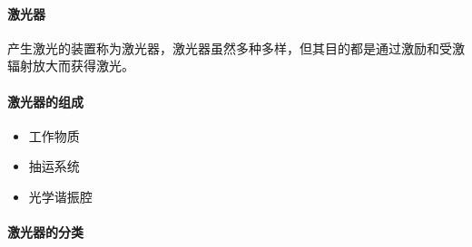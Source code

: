 \paragraph{激光器}产生激光的装置称为激光器，激光器虽然多种多样，但其目的都是通过激励和受激辐射放大而获得激光。
\paragraph{激光器的组成}\begin{itemize}
	\item 工作物质
	\item 抽运系统
	\item 光学谐振腔
\end{itemize}
\paragraph{激光器的分类}
